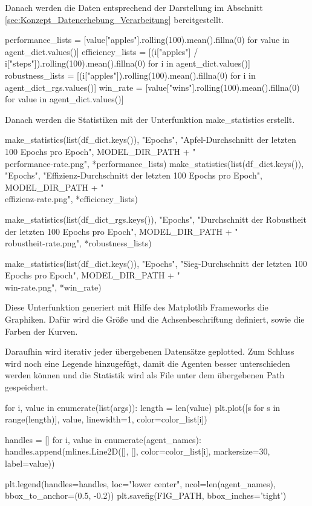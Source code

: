 Danach werden die Daten entsprechend der Darstellung im Abschnitt \ref{sec:Konzept_Datenerhebung_Verarbeitung} bereitgestellt.
\begin{python}
	performance_lists = [value["apples"].rolling(100).mean().fillna(0) for value in agent_dict.values()]
	efficiency_lists = [(i["apples"] / i["steps"]).rolling(100).mean().fillna(0) for i in agent_dict.values()]
	robustness_lists = [(i["apples"]).rolling(100).mean().fillna(0) for i in agent_dict_rgs.values()]
	win_rate = [value["wins"].rolling(100).mean().fillna(0) for value in agent_dict.values()]
\end{python}
Danach werden die Statistiken mit der Unterfunktion make\_statistics erstellt.
\begin{python}
	make_statistics(list(df_dict.keys()), "Epochs", "Apfel-Durchschnitt der letzten 100 Epochs pro Epoch",
	MODEL_DIR_PATH + "\\performance-rate.png", *performance_lists)
	make_statistics(list(df_dict.keys()), "Epochs", "Effizienz-Durchschnitt der letzten 100 Epochs pro Epoch",
	MODEL_DIR_PATH + "\\effizienz-rate.png", *efficiency_lists)
	
	make_statistics(list(df_dict_rgs.keys()), "Epochs", "Durchschnitt der Robustheit der letzten 100 Epochs pro Epoch",
	MODEL_DIR_PATH + "\\robustheit-rate.png", *robustness_lists)
	
	make_statistics(list(df_dict.keys()), "Epochs", "Sieg-Durchschnitt der letzten 100 Epochs pro Epoch",
	MODEL_DIR_PATH + "\\win-rate.png", *win_rate)
\end{python}

Diese Unterfunktion generiert mit Hilfe des Matplotlib Frameworks die Graphiken. Dafür wird die Größe und die Achsenbeschriftung definiert, sowie die Farben der Kurven.
Daraufhin wird iterativ jeder übergebenen Datensätze geplotted. Zum Schluss wird noch eine Legende hinzugefügt, damit die Agenten besser unterschieden werden können und die Statistik wird als File unter dem übergebenen Path gespeichert.
\begin{python}
	for i, value in enumerate(list(args)):
		length = len(value)
		plt.plot([s for s in range(length)], value, linewidth=1, color=color_list[i])
	
	handles = []
	for i, value in enumerate(agent_names):
		handles.append(mlines.Line2D([], [], color=color_list[i], markersize=30, label=value))
	
	plt.legend(handles=handles, loc="lower center", ncol=len(agent_names), bbox_to_anchor=(0.5, -0.2))
	plt.savefig(FIG_PATH, bbox_inches='tight')
\end{python}